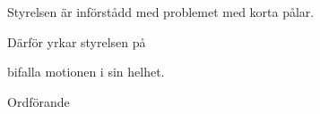 \documentclass[../_main/handlingar.tex]{subfiles}
\begin{document}
\motionssvar

Styrelsen är införstådd med problemet med korta pålar.

Därför yrkar styrelsen på

\begin{attsatser}
    \att bifalla motionen i sin helhet.
\end{attsatser}

\begin{signatures}{1}
    \ist
    \signature{\ordf}{Ordförande}
\end{signatures}
\end{document}
